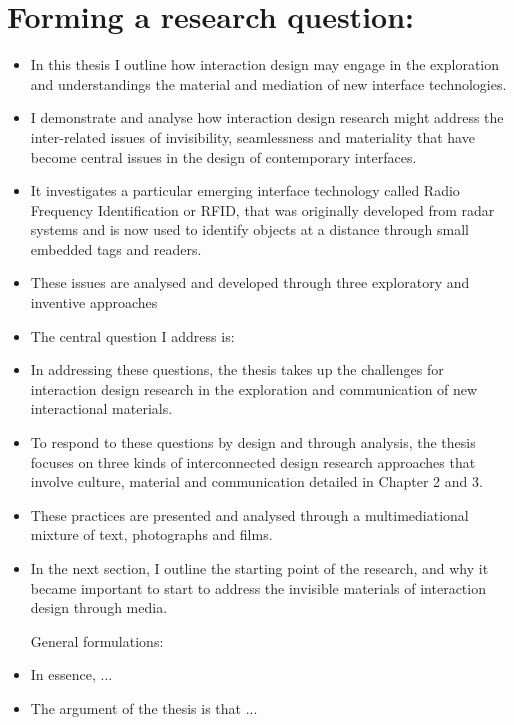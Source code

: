 \section{Forming a research question:}

\begin{itemize}
\item In this thesis I outline how interaction design may engage in the exploration and understandings the material and mediation of new interface technologies.
\item I demonstrate and analyse how interaction design research might address the inter-related issues of invisibility, seamlessness and materiality that have become central issues in the design of contemporary interfaces.
\item It investigates a particular emerging interface technology called Radio Frequency Identification or RFID, that was originally developed from radar systems and is now used to identify objects at a distance through small embedded tags and readers.
\item These issues are analysed and developed through three exploratory and inventive approaches
\item The central question I address is:
\item In addressing these questions, the thesis takes up the challenges for interaction design research in the exploration and communication of new interactional materials.
\item To respond to these questions by design and through analysis, the thesis focuses on three kinds of interconnected design research approaches that involve culture, material and communication detailed in Chapter 2 and 3.
\item These practices are presented and analysed through a multimediational mixture of text, photographs and films.
\item In the next section, I outline the starting point of the research, and why it became important to start to address the invisible materials of interaction design through media.

General formulations:

\item In essence, ...
\item The argument of the thesis is that ...


\end{itemize}
